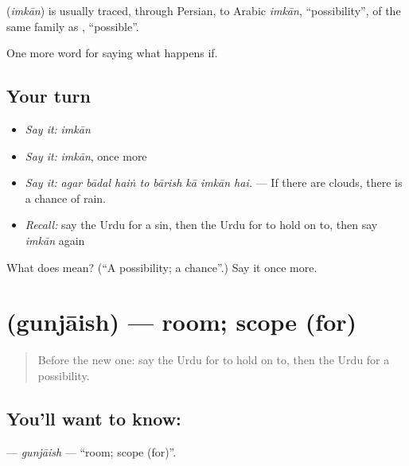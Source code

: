 \begin{cousinweb}
\textbf{} (\emph{imkān}) is usually traced, through Persian, to Arabic \emph{imkān}, \textquotedblleft{}possibility\textquotedblright{}, of the same family as \textbf{}, \textquotedblleft{}possible\textquotedblright{}.
\end{cousinweb}

\begin{grammarlens}[title={What you've built}]
One more word for saying what happens if.
\end{grammarlens}

\subsection*{Your turn}
\begin{itemize}
\raggedright
  \item \emph{Say it:} \emph{imkān}
  \item \emph{Say it:} \emph{imkān}, once more
  \item \emph{Say it:} \emph{agar bādal haiṅ to bārish kā imkān hai.} — If there are clouds, there is a chance of rain.
  \item \emph{Recall:} say the Urdu for a sin, then the Urdu for to hold on to, then say \emph{imkān} again
\end{itemize}

\begin{tcolorbox}[breakable,colback=teal!4,colframe=teal!35!black,title={Before you move on}]
What does  mean? (\textquotedblleft{}A possibility; a chance\textquotedblright{}.) Say it once more.
\end{tcolorbox}
\section[\texorpdfstring{\ur{گنجائش} (gunjāish)}{گنجائش (gunjāish)}]{ (gunjāish) — room; scope (for)}

\label{lesson:UR-C361-gunjaish}



\begin{quote}
Before the new one: say the Urdu for to hold on to, then the Urdu for a possibility.
\end{quote}

\subsection*{You'll want to know: }
\textbf{} — \emph{gunjāish} — \textquotedblleft{}room; scope (for)\textquotedblright{}.

